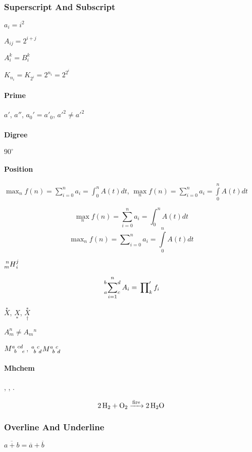\subsubsection{Superscript And Subscript}
$ a_i = i^2 $

$ A_{ij} = 2^{i+j} $

$ A_i^k = B^k_i $

$ K_{n_i} = K_{2^i} = 2^{n_i} = 2^{2^i} $

\paragraph{Prime}
$ a' $, $ a'' $, $ a_0' = a'_0 $, $ {a'}^2 \neq  a'^2 $

\paragraph{Digree}
$ 90^\circ $

\paragraph{Position}
$ \max_n f(n) = \sum_{i=0}^n a_i = \int_0^n A(t)dt $, $ \max\limits_n f(n) = \sum\limits_{i=0}^n a_i = \int\limits_0^n A(t)dt $

\[
    \max_n f(n) = \sum_{i=0}^n a_i = \int_0^n A(t)dt
\]
\[
    \max\nolimits_n f(n) = \sum\nolimits_{i=0}^n a_i = \int\limits_0^n A(t)dt
\]

$ \prescript{n}{m}{H}_i^j $     %

\[
    \sideset{_a^b}{_c^d} \sum_{i=1}^{n} A_i = \sideset{}{'}{\prod_k} f_i        %
\]

$ \overset{*}{X} $, $ \underset{*}{X} $, $ \overset{*}{\underset{\dag}{X}} $    %

$ A_m^n \neq A_m{}^n $

$ M\indices{^a_b^{cd}_e} $, $ \tensor[^a_b^c_d]{M}{^a_b^c_d} $  %

\paragraph{Mhchem}
, , .     %

\begin{equation}
    \ce{2H2 + O2 ->[\text{fire}] 2H2O}
\end{equation}

\subsubsection{Overline And Underline}
$ \overline{a + b} = \overline{a} + \overline{b} $


